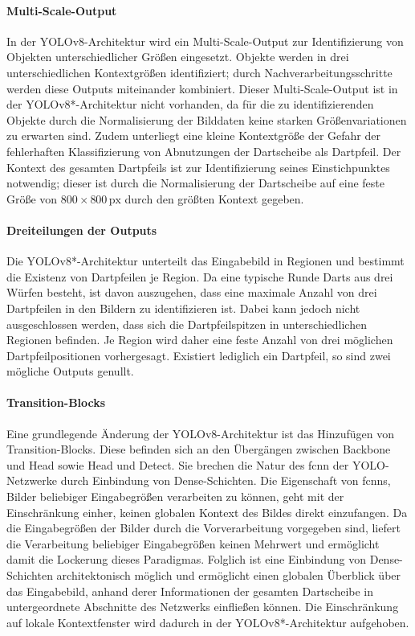 \vspace*{-0.12cm}
\paragraph{Multi-Scale-Output}

In der YOLOv8-Architektur wird ein Multi-Scale-Output zur Identifizierung von Objekten unterschiedlicher Größen eingesetzt. Objekte werden in drei unterschiedlichen Kontextgrößen identifiziert; durch Nachverarbeitungsschritte werden diese Outputs miteinander kombiniert. Dieser Multi-Scale-Output ist in der YOLOv8*-Architektur nicht vorhanden, da für die zu identifizierenden Objekte durch die Normalisierung der Bilddaten keine starken Größenvariationen zu erwarten sind. Zudem unterliegt eine kleine Kontextgröße der Gefahr der fehlerhaften Klassifizierung von Abnutzungen der Dartscheibe als Dartpfeil. Der Kontext des gesamten Dartpfeils ist zur Identifizierung seines Einstichpunktes notwendig; dieser ist durch die Normalisierung der Dartscheibe auf eine feste Größe von $800 \times 800\,\text{px}$ durch den größten Kontext gegeben.

\vspace*{-0.12cm}
\paragraph{Dreiteilungen der Outputs}

Die YOLOv8*-Architektur unterteilt das Eingabebild in Regionen und bestimmt die Existenz von Dartpfeilen je Region. Da eine typische Runde Darts aus drei Würfen besteht, ist davon auszugehen, dass eine maximale Anzahl von drei Dartpfeilen in den Bildern zu identifizieren ist. Dabei kann jedoch nicht ausgeschlossen werden, dass sich die Dartpfeilspitzen in unterschiedlichen Regionen befinden. Je Region wird daher eine feste Anzahl von drei möglichen Dartpfeilpositionen vorhergesagt. Existiert lediglich ein Dartpfeil, so sind zwei mögliche Outputs genullt.

\vspace*{-0.12cm}
\paragraph{Transition-Blocks}

Eine grundlegende Änderung der YOLOv8-Architektur ist das Hinzufügen von Transition-Blocks. Diese befinden sich an den Übergängen zwischen Backbone und Head sowie Head und Detect. Sie brechen die Natur des \ac{fcnn} der YOLO-Netzwerke durch Einbindung von Dense-Schichten. Die Eigenschaft von \acp{fcnn}, Bilder beliebiger Eingabegrößen verarbeiten zu können, geht mit der Einschränkung einher, keinen globalen Kontext des Bildes direkt einzufangen. Da die Eingabegrößen der Bilder durch die Vorverarbeitung vorgegeben sind, liefert die Verarbeitung beliebiger Eingabegrößen keinen Mehrwert und ermöglicht damit die Lockerung dieses Paradigmas. Folglich ist eine Einbindung von Dense-Schichten architektonisch möglich und ermöglicht einen globalen Überblick über das Eingabebild, anhand derer Informationen der gesamten Dartscheibe in untergeordnete Abschnitte des Netzwerks einfließen können. Die Einschränkung auf lokale Kontextfenster wird dadurch in der YOLOv8*-Architektur aufgehoben.

